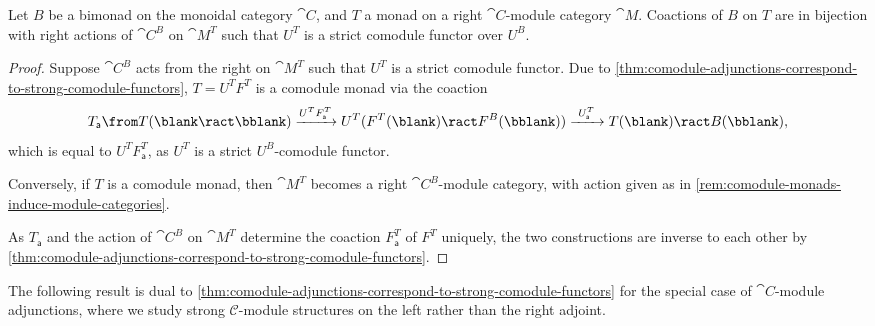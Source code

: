 \begin{theorem}\label{thm:comodule-monad-reconstruction}
  Let \(B\) be a bimonad on the monoidal category \(\cat{C}\),
  and \(T\) a monad on a right \(\cat{C}\)\hyp{}module category \(\cat{M}\).
  Coactions of \(B\) on \(T\) are
  in bijection with
  right actions of \(\cat{C}^B\) on \(\cat{M}^T\) such that \(U^{T}\) is a strict comodule functor over \(U^{B}\).
\end{theorem}
\begin{proof}
  Suppose \(\cat{C}^{B}\) acts from the right on \(\cat{M}^{T}\) such that \(U^{T}\) is a strict comodule functor.
  Due to \cref{thm:comodule-adjunctions-correspond-to-strong-comodule-functors},
  \(T = U^T F^T\) is a comodule monad via the coaction
  \[
    T_{\mathsf{a}}\from T(\blank \ract \bblank)
    \xrightarrow{U^T F^T_{\mathsf{a}}} U^T(F^T(\blank) \ract F^B(\bblank))
    \xrightarrow{\ U^T_{\mathsf{a}}\ } T(\blank) \ract B(\bblank),
  \]
  which is equal to \(U^T F^T_{\mathsf{a}}\), as \(U^T\) is a strict \(U^B\)-comodule functor.

  Conversely, if \(T\) is a comodule monad,
  then \(\cat{M}^{T}\) becomes a right \(\cat{C}^{B}\)-module category,
  with action given as in \cref{rem:comodule-monads-induce-module-categories}.

  As \(T_{\mathsf{a}}\) and the action of \(\cat{C}^B\) on \(\cat{M}^T\)
  determine the coaction \(F^T_{\mathsf{a}}\) of \(F^{T}\) uniquely,
  the two constructions are inverse to each other by
  \cref{thm:comodule-adjunctions-correspond-to-strong-comodule-functors}.
\end{proof}

The following result is dual to \cref{thm:comodule-adjunctions-correspond-to-strong-comodule-functors}
for the special case of \(\cat{C}\)\hyp{}module adjunctions,
where we study strong \(\mathcal{C}\)\hyp{}module structures on the left rather than the right adjoint.

